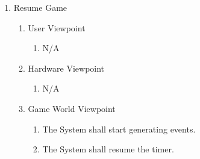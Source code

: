 \documentclass[]{article}
\begin{document}
\begin{enumerate}[{BE}1.]
\begin{enumerate}[{VP3}.1]
	\end{enumerate}
		\item Resume Game
	\begin{enumerate}[{VP4}.1]
		\item User Viewpoint
			\begin{enumerate}
				\item N/A
			\end{enumerate}
		\item Hardware Viewpoint
			\begin{enumerate}
				\item N/A
			\end{enumerate}
		\item Game World Viewpoint
			\begin{enumerate}
				\item The System shall start generating events.

				\item The System shall resume the timer.
			\end{enumerate}
			

\end{enumerate}
\end{enumerate}
\end{document}
